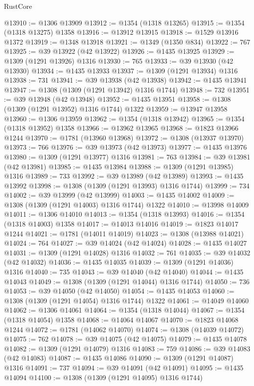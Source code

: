 \begin{lexlean}{RustCore}
\begin{coremodule}
@13910 := @1306 @13909
@13912 := @1354 (@1318 @13265)
@13915 := @1354 (@1318 @13275) @1358
@13916 := @13912 @13915
@13918 := @1529 @13916 @1372
@13919 := @1348 @13918
@13921 := @1349 (@1350 @834)
@13922 := 767
@13925 := @39 @13922 (@42 @13922)
@13926 := @1435 @13925
@13929 := @1309 (@1291 @13926) @1316
@13930 := 765
@13933 := @39 @13930 (@42 @13930)
@13934 := @1435 @13933
@13937 := @1309 (@1291 @13934) @1316
@13938 := 731
@13941 := @39 @13938 (@42 @13938)
@13942 := @1435 @13941
@13947 := @1308 (@1309 (@1291 @13942) @1316 @1744)
@13948 := 732
@13951 := @39 @13948 (@42 @13948)
@13952 := @1435 @13951
@13958 := @1308 (@1309 (@1291 @13952) @1316 @1744) @1322
@13959 := @13947 @13958
@13960 := @1306 @13959
@13962 := @1354 (@1318 @13942)
@13965 := @1354 (@1318 @13952) @1358
@13966 := @13962 @13965
@13968 := @1823 @13966 @1244
@13970 := @1781 (@13960 @13968)
@13972 := @1308 (@13937 @13970)
@13973 := 766
@13976 := @39 @13973 (@42 @13973)
@13977 := @1435 @13976
@13980 := @1309 (@1291 @13977) @1316
@13981 := 763
@13984 := @39 @13981 (@42 @13981)
@13985 := @1435 @13984
@13988 := @1309 (@1291 @13985) @1316
@13989 := 733
@13992 := @39 @13989 (@42 @13989)
@13993 := @1435 @13992
@13998 := @1308 (@1309 (@1291 @13993) @1316 @1744)
@13999 := 734
@14002 := @39 @13999 (@42 @13999)
@14003 := @1435 @14002
@14009 := @1308 (@1309 (@1291 @14003) @1316 @1744) @1322
@14010 := @13998 @14009
@14011 := @1306 @14010
@14013 := @1354 (@1318 @13993)
@14016 := @1354 (@1318 @14003) @1358
@14017 := @14013 @14016
@14019 := @1823 @14017 @1244
@14021 := @1781 (@14011 @14019)
@14023 := @1308 (@13988 @14021)
@14024 := 764
@14027 := @39 @14024 (@42 @14024)
@14028 := @1435 @14027
@14031 := @1309 (@1291 @14028) @1316
@14032 := 761
@14035 := @39 @14032 (@42 @14032)
@14036 := @1435 @14035
@14039 := @1309 (@1291 @14036) @1316
@14040 := 735
@14043 := @39 @14040 (@42 @14040)
@14044 := @1435 @14043
@14049 := @1308 (@1309 (@1291 @14044) @1316 @1744)
@14050 := 736
@14053 := @39 @14050 (@42 @14050)
@14054 := @1435 @14053
@14060 := @1308 (@1309 (@1291 @14054) @1316 @1744) @1322
@14061 := @14049 @14060
@14062 := @1306 @14061
@14064 := @1354 (@1318 @14044)
@14067 := @1354 (@1318 @14054) @1358
@14068 := @14064 @14067
@14070 := @1823 @14068 @1244
@14072 := @1781 (@14062 @14070)
@14074 := @1308 (@14039 @14072)
@14075 := 762
@14078 := @39 @14075 (@42 @14075)
@14079 := @1435 @14078
@14082 := @1309 (@1291 @14079) @1316
@14083 := 759
@14086 := @39 @14083 (@42 @14083)
@14087 := @1435 @14086
@14090 := @1309 (@1291 @14087) @1316
@14091 := 737
@14094 := @39 @14091 (@42 @14091)
@14095 := @1435 @14094
@14100 := @1308 (@1309 (@1291 @14095) @1316 @1744)

\end{coremodule}
\end{lexlean}

